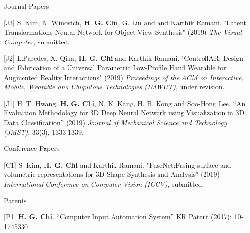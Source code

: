 


\begin{cventries}

\cvpub
{Journal Papers} %
{ %
\begin{cvitems}
\item {[J3] S. Kim, N. Winovich, \textbf{H. G. Chi}, G. Lin and and Karthik Ramani. "Latent Transformations Neural Network for Object View Synthesis" (2019) \textit{The Visual Computer}, submitted.}
\item {[J2] L.Paredes, X. Qian, \textbf{H. G. Chi} and Karthik Ramani. "ControllAR: Design and Fabrication of a Universal Parametric Low-Profile Hand Wearable for Augmented Reality Interactions" (2019) \textit{Proceedings of the ACM on Interactive, Mobile, Wearable and Ubiquitous Technologies (IMWUT)}, under revision.}
\item {[J1] H. T. Hwang, \textbf{H. G. Chi}, N. K. Kang, H. B. Kong and Soo-Hong Lee. “An Evaluation Methodology for 3D Deep Neural Network using Visualization in 3D Data Classification” (2019) \textit{Journal of Mechanical Science and Technology (JMST)}, 33(3), 1333-1339.}
\end{cvitems}
}


\cvpub
{Conference Papers} %
{ %
\begin{cvitems}
\item {[C1] S. Kim, \textbf{H. G. Chi} and Karthik Ramani. "FuseNet:Fusing surface and volumetric representations for 3D Shape Synthesis and Analysis" (2019) \textit{International Conference on Computer Vision (ICCV)}, submitted.}
\end{cvitems}
}


\cvpub
{Patents} %
{ %
\begin{cvitems}
\item {[P1] \textbf{H. G. Chi}.  “Computer Input Automation System” KR Patent (2017): 10-1745330}
\end{cvitems}
}



\end{cventries}